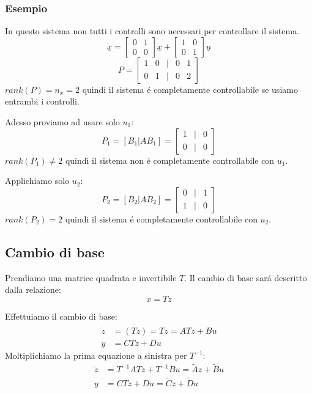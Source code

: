 \documentclass[../main.tex]{subfiles}
\begin{document}
	\subsubsection*{Esempio}
		In questo sistema non tutti i controlli sono necessari per controllare il sistema.
		\[
			\underline{\dot x} =
			\begin{bmatrix}
				0 & 1\\
				0 & 0
			\end{bmatrix} \underline x +
			\begin{bmatrix}
			1 & 0\\
			0 & 1
			\end{bmatrix} \underline u 
		\]
		\[
			P =
			\begin{bmatrix}
				1 & 0 & | & 0 & 1\\
				0 & 1 & | & 0 & 2
			\end{bmatrix}
		\]
		$ rank\left( P \right) = n_x = 2 $ quindi il sistema \'e completamente controllabile se usiamo entrambi i controlli.
		
		Adesso proviamo ad usare solo $ u_1 $:
		\[
			P_1  = \left[ B_1 | AB_1 \right] =
			\begin{bmatrix}
				1 & | & 0\\
				0 & | & 0
			\end{bmatrix}
		\]
		$ rank\left( P_1 \right) \neq 2 $ quindi il sistema non \'e completamente controllabile con $ u_1 $.
		
		Applichiamo solo $ u_2 $:
		\[
		P_2  = \left[ B_2 | AB_2 \right] =
			\begin{bmatrix}
				0 & | & 1\\
				1 & | & 0
			\end{bmatrix}
		\]
		$ rank\left( P_2 \right) = 2 $ quindi il sistema \'e completamente controllabile con $ u_2 $.
		
	\subsection{Cambio di base}
		Prendiamo una matrice quadrata e invertibile $ T $. Il cambio di base sar\'a descritto dalla relazione:
		\[ x = Tz \]
		
		Effettuiamo il cambio di base:
		\begin{align*}
			\dot z &= \dot{(Tz)} = T \dot z = ATz + Bu\\
			y &= CTz + Du
		\end{align*}
		Moltiplichiamo la prima equazione a sinistra per $ T^{-1} $:
		\begin{align}
			\dot z &= T^{-1}ATz + T^{-1}Bu = \tilde A z + \tilde B u\\
			y &= CTz + Du = \tilde C z + \tilde D u
		\end{align}
		
\end{document}
